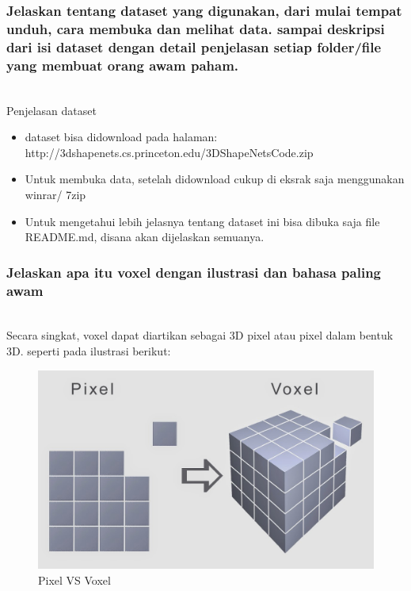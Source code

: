 \subsubsection{Jelaskan tentang dataset yang digunakan, dari mulai tempat unduh, cara membuka dan melihat data. sampai deskripsi dari isi dataset dengan detail penjelasan setiap folder/file yang membuat orang awam paham.}
\hfill\\
Penjelasan dataset
\begin{itemize}
	\item dataset bisa didownload pada halaman: http://3dshapenets.cs.princeton.edu/3DShapeNetsCode.zip
	\item Untuk membuka data, setelah didownload cukup di eksrak saja menggunakan winrar/ 7zip
	\item Untuk mengetahui lebih jelasnya tentang dataset ini bisa dibuka saja file README.md, disana akan dijelaskan semuanya.

\end{itemize}

\subsubsection{Jelaskan apa itu voxel dengan ilustrasi dan bahasa paling awam}
\hfill\\
Secara singkat, voxel dapat diartikan sebagai 3D pixel atau pixel dalam bentuk 3D. seperti pada ilustrasi berikut:
\begin{figure}[H]
	\centering
	\includegraphics[width=12cm]{figures/1174087/8/p7.png}
	\caption{Pixel VS Voxel}
\end{figure}


